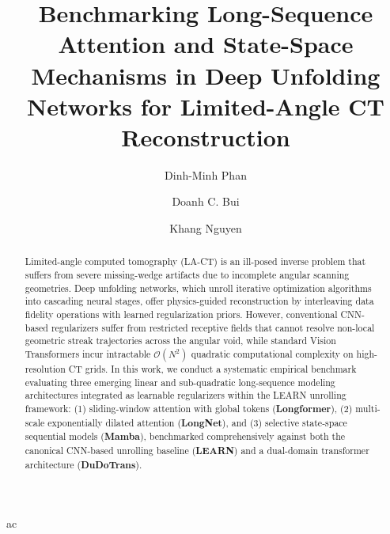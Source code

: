 \documentclass[runningheads]{llncs}
\begin{document}
\title{Benchmarking Long-Sequence Attention and State-Space Mechanisms in Deep Unfolding Networks for Limited-Angle CT Reconstruction}

\author{Dinh-Minh Phan \and 
Doanh C. Bui \and 
Khang Nguyen}



\maketitle
ac
\begin{abstract}
Limited-angle computed tomography (LA-CT) is an ill-posed inverse problem that suffers from severe missing-wedge artifacts due to incomplete angular scanning geometries. Deep unfolding networks, which unroll iterative optimization algorithms into cascading neural stages, offer physics-guided reconstruction by interleaving data fidelity operations with learned regularization priors. However, conventional CNN-based regularizers suffer from restricted receptive fields that cannot resolve non-local geometric streak trajectories across the angular void, while standard Vision Transformers incur intractable $\mathcal{O}(N^2)$ quadratic computational complexity on high-resolution CT grids. In this work, we conduct a systematic empirical benchmark evaluating three emerging linear and sub-quadratic long-sequence modeling architectures integrated as learnable regularizers within the LEARN unrolling framework: (1) sliding-window attention with global tokens (\textbf{Longformer}), (2) multi-scale exponentially dilated attention (\textbf{LongNet}), and (3) selective state-space sequential models (\textbf{Mamba}), benchmarked comprehensively against both the canonical CNN-based unrolling baseline (\textbf{LEARN}) and a dual-domain transformer architecture (\textbf{DuDoTrans}). 

\end{abstract}
\end{document}
